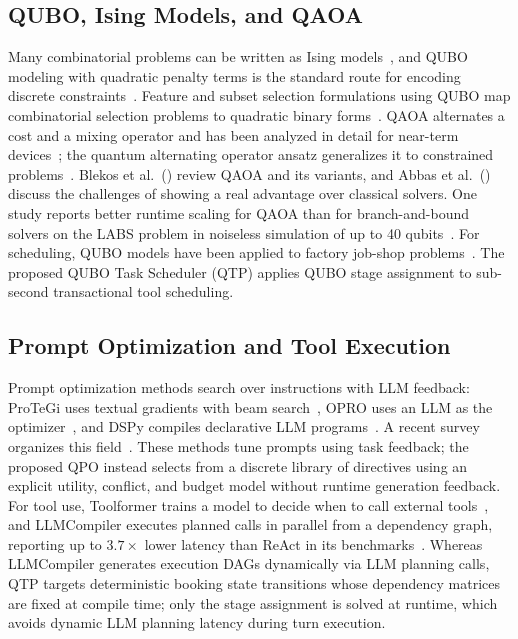 \documentclass[review,12pt,times,authoryear]{elsarticle}
\theoremstyle{definition}
\begin{document}
\subsection{QUBO, Ising Models, and QAOA}
Many combinatorial problems can be written as Ising models~\citep{Lucas2014}, and QUBO modeling with quadratic penalty terms is the standard route for encoding discrete constraints~\citep{Glover2019}. Feature and subset selection formulations using QUBO map combinatorial selection problems to quadratic binary forms~\citep{Lucas2014,Date2021,Mucke2023}. QAOA alternates a cost and a mixing operator and has been analyzed in detail for near-term devices~\citep{Zhou2020}; the quantum alternating operator ansatz generalizes it to constrained problems~\citep{Hadfield2019}. Blekos et al.~(\citeyear{Blekos2024}) review QAOA and its variants, and Abbas et al.~(\citeyear{Abbas2024}) discuss the challenges of showing a real advantage over classical solvers. One study reports better runtime scaling for QAOA than for branch-and-bound solvers on the LABS problem in noiseless simulation of up to 40 qubits~\citep{Shaydulin2024}. For scheduling, QUBO models have been applied to factory job-shop problems~\citep{Geitz2022,Aggoune2023}. The proposed QUBO Task Scheduler (QTP) applies QUBO stage assignment to sub-second transactional tool scheduling.

\subsection{Prompt Optimization and Tool Execution}
Prompt optimization methods search over instructions with LLM feedback: ProTeGi uses textual gradients with beam search~\citep{Pryzant2023}, OPRO uses an LLM as the optimizer~\citep{Yang2024}, and DSPy compiles declarative LLM programs~\citep{Khattab2024}. A recent survey organizes this field~\citep{Ramnath2025}. These methods tune prompts using task feedback; the proposed QPO instead selects from a discrete library of directives using an explicit utility, conflict, and budget model without runtime generation feedback. For tool use, Toolformer trains a model to decide when to call external tools~\citep{Schick2023}, and LLMCompiler executes planned calls in parallel from a dependency graph, reporting up to $3.7\times$ lower latency than ReAct in its benchmarks~\citep{Kim2024}. Whereas LLMCompiler generates execution DAGs dynamically via LLM planning calls, QTP targets deterministic booking state transitions whose dependency matrices are fixed at compile time; only the stage assignment is solved at runtime, which avoids dynamic LLM planning latency during turn execution.
\end{document}
